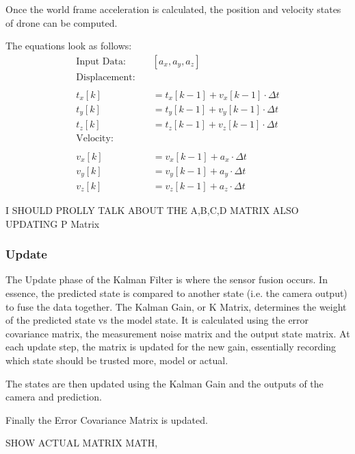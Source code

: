 \documentclass[bare_jrnl_transmag]{subfiles}
\begin{document}
Once the world frame acceleration is calculated, the position and velocity states of drone can be computed.

The equations look as follows:
\begin{align*}
    \text{Input Data:} \quad & [a_x, a_y, a_z] \\[1ex]
    
    \text{Displacement:} \quad \\ \\
    t_x[k] &= t_x[k-1] + v_x[k-1] \cdot \Delta t \\
    t_y[k] &= t_y[k-1] + v_y[k-1] \cdot \Delta t \\
    t_z[k] &= t_z[k-1] + v_z[k-1] \cdot \Delta t \\
    
    
    \text{Velocity:} \quad \\ \\
    v_x[k] &= v_x[k-1] + a_x \cdot \Delta t \\
    v_y[k] &= v_y[k-1] + a_y \cdot \Delta t \\
    v_z[k] &= v_z[k-1] + a_z \cdot \Delta t
\end{align*}

I SHOULD PROLLY TALK ABOUT THE A,B,C,D MATRIX ALSO UPDATING P Matrix

    
\subsubsection{Update}
The Update phase of the Kalman Filter is where the sensor fusion occurs. In essence, the predicted state is compared to another state (i.e. the camera output) to fuse the data together. 
The Kalman Gain, or K Matrix, determines the weight of the predicted state vs the model state. It is calculated using the error covariance matrix, the measurement noise matrix and the output state matrix. 
At each update step, the matrix is updated for the new gain, essentially recording which state should be trusted more, model or actual.

The states are then updated using the Kalman Gain and the outputs of the camera and prediction.

Finally the Error Covariance Matrix is updated.

SHOW ACTUAL MATRIX MATH, 
\end{document}
